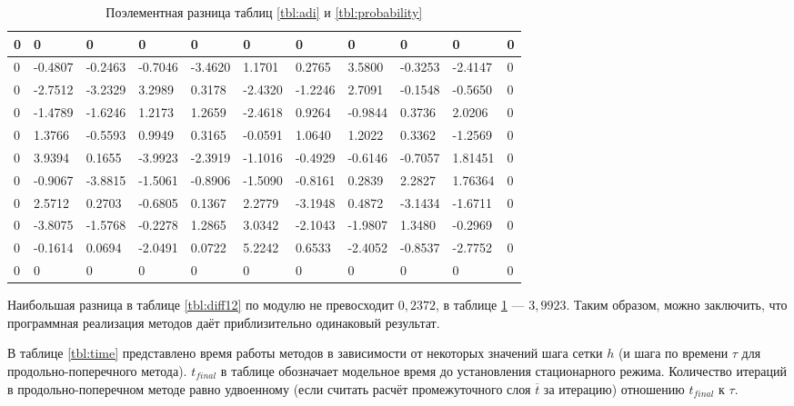 \documentclass[12pt, a4paper]{article}
\begin{document}
\begin{table}[H]
	\small
	\caption{Поэлементная разница таблиц \ref{tbl:adi} и \ref{tbl:probability}}
	\label{tbl:diff13}
	\begin{tabular}{|l|l|l|l|l|l|l|l|l|l|l|}
		\hline
		0 & 0       & 0       & 0       & 0       & 0       & 0       & 0       & 0       & 0       & 0 \\ \hline
		0 & -0.4807 & -0.2463 & -0.7046 & -3.4620 & 1.1701  & 0.2765  & 3.5800  & -0.3253 & -2.4147 & 0 \\ \hline
		0 & -2.7512 & -3.2329 & 3.2989  & 0.3178  & -2.4320 & -1.2246 & 2.7091  & -0.1548 & -0.5650 & 0 \\ \hline
		0 & -1.4789 & -1.6246 & 1.2173  & 1.2659  & -2.4618 & 0.9264  & -0.9844 & 0.3736  & 2.0206  & 0 \\ \hline
		0 & 1.3766  & -0.5593 & 0.9949  & 0.3165  & -0.0591 & 1.0640  & 1.2022  & 0.3362  & -1.2569 & 0 \\ \hline
		0 & 3.9394  & 0.1655  & -3.9923 & -2.3919 & -1.1016 & -0.4929 & -0.6146 & -0.7057 & 1.81451 & 0 \\ \hline
		0 & -0.9067 & -3.8815 & -1.5061 & -0.8906 & -1.5090 & -0.8161 & 0.2839  & 2.2827  & 1.76364 & 0 \\ \hline
		0 & 2.5712  & 0.2703  & -0.6805 & 0.1367  & 2.2779  & -3.1948 & 0.4872  & -3.1434 & -1.6711 & 0 \\ \hline
		0 & -3.8075 & -1.5768 & -0.2278 & 1.2865  & 3.0342  & -2.1043 & -1.9807 & 1.3480  & -0.2969 & 0 \\ \hline
		0 & -0.1614 & 0.0694  & -2.0491 & 0.0722  & 5.2242  & 0.6533  & -2.4052 & -0.8537 & -2.7752 & 0 \\ \hline
		0 & 0       & 0       & 0       & 0       & 0       & 0       & 0       & 0       & 0       & 0 \\ \hline
	\end{tabular}
\end{table}

Наибольшая разница в таблице \ref{tbl:diff12} по модулю не превосходит $0,2372$, в таблице \ref{tbl:diff13} — $3,9923$.
Таким образом, можно заключить, что программная реализация методов даёт приблизительно одинаковый результат.

В таблице \ref{tbl:time} представлено время работы методов в зависимости от некоторых значений шага сетки $h$ (и шага по времени $\tau$ для продольно-поперечного метода).
$t_{final}$ в таблице обозначает модельное время до установления стационарного режима.
Количество итераций в продольно-поперечном методе равно удвоенному (если считать расчёт промежуточного слоя $\overline t$ за итерацию) отношению $t_{final}$ к $\tau$.
\end{document}
